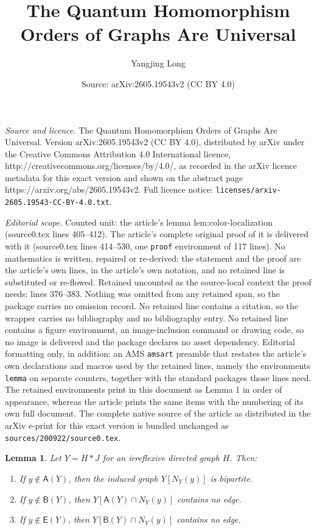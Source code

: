 \documentclass[10pt,a4paper]{amsart}
\title{The Quantum Homomorphism Orders of Graphs Are Universal}
\author{Yangjing Long}
\date{Source: arXiv:2605.19543v2 (CC BY 4.0)}
\newtheorem{lemma}{Lemma}
\newcommand{\Aset}{\mathsf A}
\newcommand{\Bset}{\mathsf B}
\newcommand{\Eset}{\mathsf E}
\begin{document}
\maketitle

\noindent\emph{Source and licence.} The Quantum Homomorphism Orders of Graphs Are Universal. Version arXiv:2605.19543v2 (CC BY 4.0), distributed by arXiv under the Creative Commons Attribution 4.0 International licence, http://creativecommons.org/licenses/by/4.0/, as recorded in the arXiv licence metadata for this exact version and shown on the abstract page https://arxiv.org/abs/2605.19543v2. Full licence notice: \texttt{licenses/arxiv-2605.19543-CC-BY-4.0.txt}.\par\smallskip

\noindent\textit{Editorial scope.} Counted unit: the article's lemma lem:color-localization (source0.tex lines 405--412). The article's complete original proof of it is delivered with it (source0.tex lines 414--530, one \texttt{proof} environment of 117 lines). No mathematics is written, repaired or re-derived: the statement and the proof are the article's own lines, in the article's own notation, and no retained line is substituted or re-flowed.  Retained uncounted as the source-local context the proof needs: lines 376--383.  Nothing was omitted from any retained span, so the package carries no omission record.  No retained line contains a citation, so the wrapper carries no bibliography and no bibliography entry.  No retained line contains a figure environment, an image-inclusion command or drawing code, so no image is delivered and the package declares no asset dependency.  Editorial formatting only, in addition: an AMS \texttt{amsart} preamble that restates the article's own declarations and macros used by the retained lines, namely the environments \texttt{lemma} on separate counters, together with the standard packages those lines need.  The retained environments print in this document as Lemma 1 in order of appearance, whereas the article prints the same items with the numbering of its own full document.  The complete native source of the article as distributed in the arXiv e-print for this exact version is bundled unchanged as \texttt{sources/200922/source0.tex}.
\begin{lemma}\label{lem:structural-color}
Let $Y=H*J$ for an irreflexive directed graph $H$.  Then:
\begin{enumerate}[label=\textup{(\roman*)}]
\item If $y\notin \Aset(Y)$, then the induced graph $Y[N_Y(y)]$ is bipartite.
\item If $y\notin \Bset(Y)$, then $Y[\Aset(Y)\cap N_Y(y)]$ contains no edge.
\item If $y\notin \Eset(Y)$, then $Y[\Bset(Y)\cap N_Y(y)]$ contains no edge.
\end{enumerate}
\end{lemma}
\end{document}
